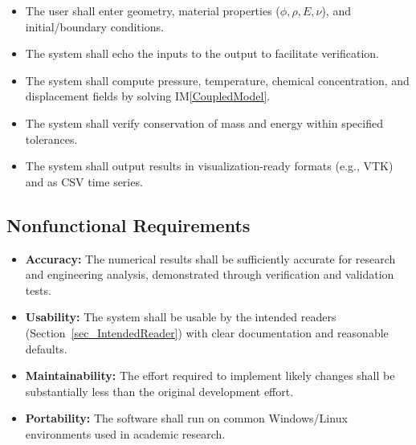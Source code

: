 \documentclass[12pt]{article}
\newcounter{reqnum} %
\newcounter{nfrnum} %
\begin{document}
\begin{itemize}
\item[R\refstepcounter{reqnum}\thereqnum \label{R_Inputs}:]
The user shall enter geometry, material properties ($\phi, \rho, E, \nu$), and initial/boundary conditions.

\item[R\refstepcounter{reqnum}\thereqnum \label{R_OutputInputs}:]
The system shall echo the inputs to the output to facilitate verification.

\item[R\refstepcounter{reqnum}\thereqnum \label{R_Calculate}:]
The system shall compute pressure, temperature, chemical concentration, and displacement fields by solving IM\ref{CoupledModel}.

\item[R\refstepcounter{reqnum}\thereqnum \label{R_VerifyOutput}:]
The system shall verify conservation of mass and energy within specified tolerances.

\item[R\refstepcounter{reqnum}\thereqnum \label{R_Output}:]
The system shall output results in visualization-ready formats (e.g., VTK) and as CSV time series.
\end{itemize}

\subsection{Nonfunctional Requirements}

\begin{itemize}
\item[NFR\refstepcounter{nfrnum}\thenfrnum \label{NFR_Accuracy}:]
\textbf{Accuracy:} The numerical results shall be sufficiently accurate for research and engineering analysis, demonstrated through verification and validation tests.

\item[NFR\refstepcounter{nfrnum}\thenfrnum \label{NFR_Usability}:]
\textbf{Usability:} The system shall be usable by the intended readers (Section~\ref{sec_IntendedReader}) with clear documentation and reasonable defaults.

\item[NFR\refstepcounter{nfrnum}\thenfrnum \label{NFR_Maintainability}:]
\textbf{Maintainability:} The effort required to implement likely changes shall be substantially less than the original development effort.

\item[NFR\refstepcounter{nfrnum}\thenfrnum \label{NFR_Portability}:]
\textbf{Portability:} The software shall run on common Windows/Linux environments used in academic research.
\end{itemize}
\end{document}
